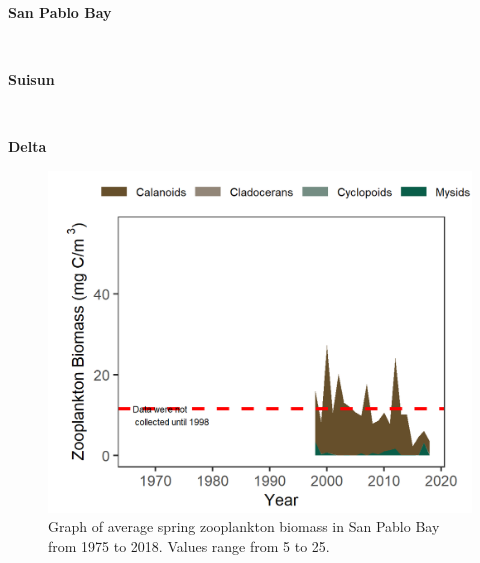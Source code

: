 \documentclass[
]{book}
\begin{document}
\begin{panel-grid}

\begin{columns-nocenter}

\begin{column800}

\textbf{San Pablo Bay}

\end{column800}

\begin{column40}

~

\end{column40}

\begin{column800}

\textbf{Suisun}

\end{column800}

\begin{column40}

~

\end{column40}

\begin{column800}

\textbf{Delta}

\end{column800}

\end{columns-nocenter}

\begin{columns-nocenter}

\begin{column800}

\begin{expand}

\begin{figure}
\includegraphics[width=15.25in]{figures/zoops_splspring} \caption{Graph of average spring zooplankton biomass in San Pablo Bay from 1975 to 2018. Values range from 5 to 25.}\label{fig:unnamed-chunk-27}
\end{figure}


\end{expand}
\end{column800}
\end{columns-nocenter}
\end{panel-grid}
\end{document}
